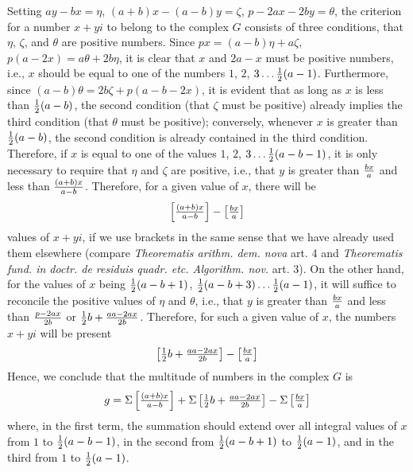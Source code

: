 \documentclass[twoside,12pt]{memoir}
\let\oldfrac\frac
\def\frac#1#2{\mathchoice{\tfrac{#1}{#2}}{\oldfrac{#1}{#2}}{\genfrac{}{}{}{2}{#1}{#2\mathstrut}}{\genfrac{}{}{}{3}{#1}{#2\mathstrut}}}
\begin{document}
Setting \(a y-b x=\eta\), \((a+b) x-(a-b) y=\zeta\), \(p-2 a x-2 b y=\theta\), the criterion for a number \(x+yi\) to belong to the complex \(G\) consists of three conditions, that \(\eta\), \(\zeta\), and \(\theta\) are positive numbers. Since \(p x=(a-b) \eta+a \zeta\), \(p(a-2 x)=a \theta+2 b \eta\), it is clear that \(x\) and \(2a-x\) must be positive numbers, i{.}e{.}, \(x\) should be equal to one of the numbers \(1\), \(2\), \(3\ldots \frac{1}{2}(a-1)\). Furthermore, since \((a-b) \theta=2 b \zeta+p(a-b-2 x)\), it is evident that as long as \(x\) is less than \(\frac{1}{2}(a-b)\), the second condition (that \(\zeta\) must be positive) already implies the third condition (that \(\theta\) must be positive); conversely, whenever \(x\) is greater than \(\frac{1}{2}(a-b)\), the second condition is already contained in the third condition. Therefore, if \(x\) is equal to one of the values \(1\), \(2\), \(3\ldots \frac{1}{2}(a-b-1)\), it is only necessary to require that \(\eta\) and \(\zeta\) are positive, i{.}e{.}, that \(y\) is greater than \(\frac{b x}{a}\) and less than \(\frac{(a+b) x}{a-b}\). Therefore, for a given value of \(x\), there will be
\[\left[\frac{(a+b) x}{a-b}\right]-\left[\frac{b x}{a}\right]\]
values of \(x+yi\), if we use brackets in the same sense that we have already used them elsewhere (compare \textit{Theorematis arithm. dem. nova} art. 4 and \textit{Theorematis fund{.} in doctr. de residuis quadr. etc{.} Algorithm. nov.} art. 3). On the other hand, for the values of \(x\) being \(\frac{1}{2}(a-b+1)\), \(\frac{1}{2}(a-b+3)\ldots \frac{1}{2}(a-1)\), it will suffice to reconcile the positive values of \(\eta\) and \(\theta\), i{.}e{.}, that \(y\) is greater than \(\frac{b x}{a}\) and less than \(\frac{p-2 a x}{2 b}\) or \(\frac{1}{2} b+\frac{a a-2 a x}{2 b}\). Therefore, for such a given value of \(x\), the numbers \(x+yi\) will be present
\[\left[\frac{1}{2} b+\frac{a a-2 a x}{2 b}\right]-\left[\frac{b x}{a}\right]\]
Hence, we conclude that the multitude of numbers in the complex \(G\) is
\[g=\Sigma\left[\frac{(a+b) x}{a-b}\right]+\Sigma\left[\frac{1}{2} b+\frac{a a-2 a x}{2 b}\right]-\Sigma\left[\frac{b x}{a}\right]\]
where, in the first term, the summation should extend over all integral values of \(x\) from \(1\) to \(\frac{1}{2}(a-b-1)\), in the second from \(\frac{1}{2}(a-b+1)\) to \(\frac{1}{2}(a-1)\), and in the third from \(1\) to \(\frac{1}{2}(a-1)\).
\end{document}
